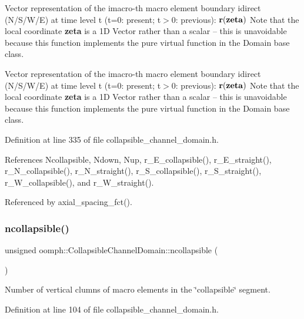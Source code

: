 Vector representation of the imacro-\/th macro element boundary idirect (N/\+S/\+W/E) at time level t (t=0\+: present; t$>$0\+: previous)\+: $ {\bf r}({\bf zeta}) $ Note that the local coordinate {\bfseries zeta} is a 1D Vector rather than a scalar -- this is unavoidable because this function implements the pure virtual function in the Domain base class. 

Vector representation of the imacro-\/th macro element boundary idirect (N/\+S/\+W/E) at time level t (t=0\+: present; t$>$0\+: previous)\+: $ {\bf r}({\bf zeta}) $ Note that the local coordinate {\bfseries zeta} is a 1D Vector rather than a scalar -- this is unavoidable because this function implements the pure virtual function in the Domain base class. 

Definition at line 335 of file collapsible\+\_\+channel\+\_\+domain.\+h.



References Ncollapsible, Ndown, Nup, r\+\_\+\+E\+\_\+collapsible(), r\+\_\+\+E\+\_\+straight(), r\+\_\+\+N\+\_\+collapsible(), r\+\_\+\+N\+\_\+straight(), r\+\_\+\+S\+\_\+collapsible(), r\+\_\+\+S\+\_\+straight(), r\+\_\+\+W\+\_\+collapsible(), and r\+\_\+\+W\+\_\+straight().



Referenced by axial\+\_\+spacing\+\_\+fct().

\mbox{\label{classoomph_1_1CollapsibleChannelDomain_a59dd9d4001621752439ad95ceb8daa1b}} 
\subsubsection{\texorpdfstring{ncollapsible()}{ncollapsible()}}
{\footnotesize\ttfamily unsigned oomph\+::\+Collapsible\+Channel\+Domain\+::ncollapsible (\begin{DoxyParamCaption}{ }\end{DoxyParamCaption})\hspace{0.3cm}{\ttfamily [inline]}}



Number of vertical clumns of macro elements in the \char`\"{}collapsible\char`\"{} segment. 



Definition at line 104 of file collapsible\+\_\+channel\+\_\+domain.\+h.



